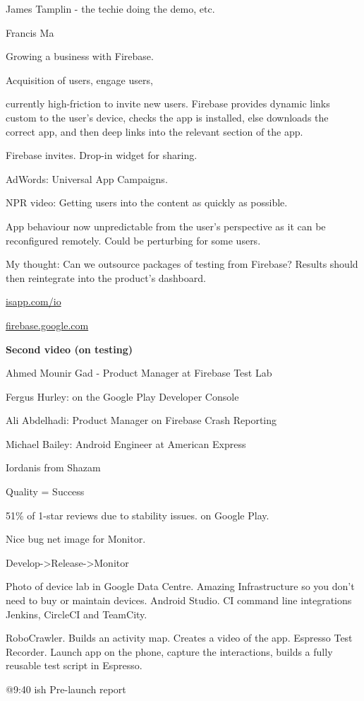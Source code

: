 James Tamplin - the techie doing the demo, etc.

Francis Ma 

Growing a business with Firebase.

Acquisition of users, engage users, 

currently high-friction to invite new users. Firebase provides dynamic links custom to the user’s device, checks the app is installed, else downloads the correct app, and then deep links into the relevant section of the app. 

Firebase invites. Drop-in widget for sharing.

AdWords: Universal App Campaigns. 

NPR video: Getting users into the content as quickly as possible.

App behaviour now unpredictable from the user’s perspective as it can be reconfigured remotely. Could be perturbing for some users.

My thought: Can we outsource packages of testing from Firebase? Results should then reintegrate into the product’s dashboard.

\url{isapp.com/io} 

\url{firebase.google.com}

\textbf{Second video (on testing)}

Ahmed Mounir Gad - Product Manager at Firebase Test Lab

Fergus Hurley: on the Google Play Developer Console

Ali Abdelhadi:  Product Manager on Firebase Crash Reporting

Michael Bailey:  Android Engineer at American Express

Iordanis from Shazam

Quality = Success

51\% of 1-star reviews due to stability issues. on Google Play.

Nice bug net image for Monitor. 

Develop->Release->Monitor

Photo of device lab in Google Data Centre. Amazing Infrastructure so you don’t need to buy or maintain devices. Android Studio. CI command line integrations Jenkins, CircleCI and TeamCity.

RoboCrawler. Builds an activity map. Creates a video of the app. Espresso Test Recorder. Launch app on the phone, capture the interactions, builds a fully reusable test script in Espresso. 

@9:40 ish Pre-launch report


